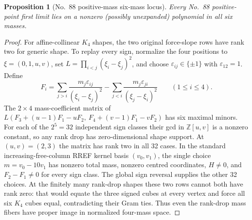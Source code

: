 \documentclass[11pt]{amsart}
\newtheorem{proposition}[theorem]{Proposition}
\theoremstyle{remark}
\begin{document}
\begin{proposition}[No.~88 positive-mass six-mass locus]\label{prop:no88-locus}
Every No.~88 positive-point first limit lies on a nonzero (possibly unexpanded) polynomial in all six masses.
\end{proposition}
\begin{proof}
For affine-collinear $K_4$ shapes, the two original force-slope rows have rank two for generic shape. To replay every sign, normalize the four positions to $\xi=(0,1,u,v)$, set $L=\prod_{i<j}(\xi_i-\xi_j)^2$, and choose $\varepsilon_{ij}\in\{\pm1\}$ with $\varepsilon_{12}=1$. Define
\[
F_i=\sum_{j>i}\frac{m_j\varepsilon_{ij}}{(\xi_i-\xi_j)^2}
-\sum_{j<i}\frac{m_j\varepsilon_{ji}}{(\xi_j-\xi_i)^2}
\qquad(1\le i\le4).
\]
The $2\times4$ mass-coefficient matrix of $L(F_3+(u-1)F_1-uF_2,\ F_4+(v-1)F_1-vF_2)$ has six maximal minors. For each of the $2^5=32$ independent sign classes their gcd in $\mathbb Z[u,v]$ is a nonzero constant, so any rank drop has zero-dimensional shape support. At $(u,v)=(2,3)$ the matrix has rank two in all 32 cases. In the standard increasing-free-column RREF kernel basis $(v_0,v_1)$, the single choice $m=v_0-10v_1$ has nonzero total mass, nonzero centred coordinates, $H\ne0$, and $F_2-F_1\ne0$ for every sign class. The global sign reversal supplies the other 32 choices. At the finitely many rank-drop shapes these two rows cannot both have rank zero: that would equate the three signed cubes at every vertex and force all six $K_4$ cubes equal, contradicting their Gram ties. Thus even the rank-drop mass fibers have proper image in normalized four-mass space.


\end{proof}
\end{document}

